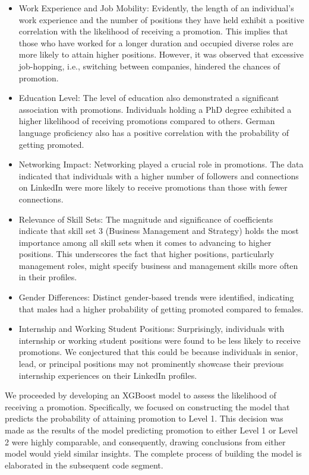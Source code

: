 \documentclass[11pt,]{article}
\begin{document}
\begin{itemize}
\item
  Work Experience and Job Mobility: Evidently, the length of an
  individual's work experience and the number of positions they have
  held exhibit a positive correlation with the likelihood of receiving a
  promotion. This implies that those who have worked for a longer
  duration and occupied diverse roles are more likely to attain higher
  positions. However, it was observed that excessive job-hopping, i.e.,
  switching between companies, hindered the chances of promotion.
\item
  Education Level: The level of education also demonstrated a
  significant association with promotions. Individuals holding a PhD
  degree exhibited a higher likelihood of receiving promotions compared
  to others. German language proficiency also has a positive correlation
  with the probability of getting promoted.
\item
  Networking Impact: Networking played a crucial role in promotions. The
  data indicated that individuals with a higher number of followers and
  connections on LinkedIn were more likely to receive promotions than
  those with fewer connections.
\item
  Relevance of Skill Sets: The magnitude and significance of
  coefficients indicate that skill set 3 (Business Management and
  Strategy) holds the most importance among all skill sets when it comes
  to advancing to higher positions. This underscores the fact that
  higher positions, particularly management roles, might specify
  business and management skills more often in their profiles.
\item
  Gender Differences: Distinct gender-based trends were identified,
  indicating that males had a higher probability of getting promoted
  compared to females.
\item
  Internship and Working Student Positions: Surprisingly, individuals
  with internship or working student positions were found to be less
  likely to receive promotions. We conjectured that this could be
  because individuals in senior, lead, or principal positions may not
  prominently showcase their previous internship experiences on their
  LinkedIn profiles.
\end{itemize}

We proceeded by developing an XGBoost model to assess the likelihood of
receiving a promotion. Specifically, we focused on constructing the
model that predicts the probability of attaining promotion to Level 1.
This decision was made as the results of the model predicting promotion
to either Level 1 or Level 2 were highly comparable, and consequently,
drawing conclusions from either model would yield similar insights. The
complete process of building the model is elaborated in the subsequent
code segment.
\end{document}
